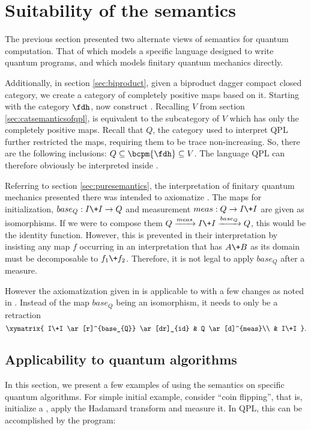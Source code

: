 
\section{Suitability of the semantics} %
\label{sec:suitability_of_the_semantics}
The previous section presented two alternate views of semantics for quantum computation. That of
\cite{selinger04:qpl} which models a specific language designed to write quantum
programs, and \cite{abramsky04:catsemquantprot} which models finitary quantum mechanics directly.

Additionally, in section \ref{sec:biproduct}, given a biproduct dagger compact closed category, we
create a category of completely positive maps based on it. Starting with the category $\fdh$, now
construct \bcpm{\fdh}. Recalling $V$ from section \ref{sec:catsemanticsofqpl}, \bcpm{\fdh} is
equivalent to the subcategory of $V$ which has only the completely positive maps. Recall that $Q$,
the category used to interpret QPL further restricted the maps, requiring them to be trace
non-increasing. So, there are the following inclusions: $Q\subseteq \bcpm{\fdh} \subseteq V$. The
language QPL can therefore obviously be interpreted inside \bcpm{\fdh}.

Referring to section \ref{sec:puresemantics}, the interpretation of finitary quantum mechanics
presented there was intended to axiomatize \fdh. The maps for initialization, $base_{Q}:I\+I \to Q$
and measurement $meas:Q\to I\+I$ are given as isomorphisms. If we were to compose them
$Q\xrightarrow{meas}I\+I\xrightarrow{base_{Q}} Q$, this would be the identity function. However,
this is prevented in their interpretation by insisting any map $f$ occurring in an interpretation
that has $A\+B$ as its domain must be decomposable to $f_{1}\+f_{2}$. Therefore, it is not legal to
apply $base_{Q}$ after a measure.

However the axiomatization given in \cite{abramsky04:catsemquantprot} is applicable to \bcpm{\fdh}
with a few changes as noted in \cite{selinger05:dagger}. Instead of the map $base_{Q}$ being an
isomorphism, it needs to only be a retraction
\[
  \xymatrix{
    I\+I \ar[r]^{base_{Q}} \ar[dr]_{id} & Q \ar[d]^{meas}\\
    & I\+I
    }.
\]

\subsection{Applicability to quantum algorithms}\label{sec:applicability}
In this section, we present a few examples of using the semantics on specific quantum algorithms.
For simple initial example, consider ``coin flipping'', that is, initialize a \qbit, apply the
Hadamard transform and measure it. In QPL, this can be accomplished by the program:


